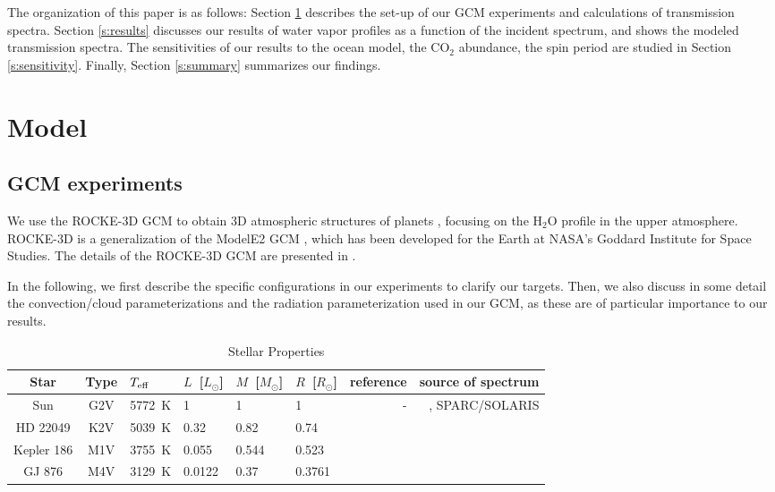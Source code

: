 \documentclass[11pt,numberedappendix,twocolappendix,]{emulateapj}
\def\water{H$_2$O}
\def\modelE{ROCKE-3D}
\def\wv{water vapor}
\def\revise#1{{\color{red}{#1}}}
\begin{document}
The organization of this paper is as follows: %
Section \ref{s:model} describes the set-up of our GCM experiments and  calculations of transmission spectra. %
Section \ref{s:results} discusses our results of \wv{} profiles as a function of the incident spectrum, and shows the modeled transmission spectra. %
The sensitivities of our results to the ocean model, the CO$_2$ abundance, the spin period\revise{, and the water vapor continuum absorption} are studied in Section \ref{s:sensitivity}. %
Finally, Section \ref{s:summary} summarizes our findings. %


\section{Model}
\label{s:model}

\subsection{GCM experiments}

We use the \modelE{} GCM \citep{Way2017} to obtain 3D atmospheric structures of \revise{terrestrial} planets \revise{with surface water under varying irradiation}, focusing on the \water{} profile in the upper atmosphere. 
\modelE{} is a generalization of the ModelE2 GCM \citep{Schmidt2014}, which has been developed for the Earth at NASA's Goddard Institute for Space Studies. 
The details of the ROCKE-3D GCM are presented in \citet{Way2017}.

In the following, we first describe the specific configurations in our experiments to clarify our targets. Then, we also discuss in some detail the convection/cloud parameterizations and the radiation parameterization used in our GCM, as these are of particular importance to our results. 

\begin{table}[!btp]
\caption{Stellar Properties}
\begin{center}
\begin{tabular}{ccllllrr} \hline \hline
%
Star & Type & $T_{\rm eff}$ & $L$~[$L_{\odot}$] & $M$~[$M_{\odot}$] & $R$~[$R_{\odot}$] & reference & source of spectrum \\ \hline
%
Sun & G2V & 5772~K & 1 & 1 & 1 & - & \citet{Lean2005}, SPARC/SOLARIS\footnotemark[1] \\ 
%
HD 22049 & K2V & 5039~K & 0.32 & 0.82 & 0.74 & \citet{Baines2012} & \citet{Segura2003} \\
%
Kepler 186 & M1V & 3755~K & 0.055 & 0.544 & 0.523 & \citet{Torres2015} & \citet{Allard2012} \\
%
GJ 876 & M4V & 3129~K & 0.0122 & 0.37 & 0.3761 & \citet{vonBraun2014} & \citet{Domagal-Goldman2014} \\ \hline
\end{tabular}
\end{center}
\label{tbl:stellar_properties}
\end{table}%
\end{document}
